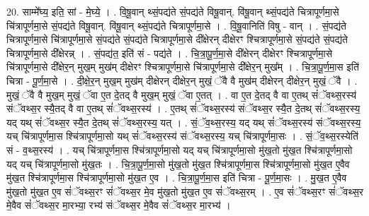 \documentclass[17pt]{extarticle}
\begin{document}
20. साम्मे᳚घ्य॒ इति॒ सां - मे॒घ्ये॒ । . वि॒षू॒वान् थ्सं॒पद्य॑ते सं॒पद्य॑ते विषू॒वान्. वि॑षू॒वान् थ्सं॒पद्य॑ते चित्रापूर्णमा॒से चि॑त्रापूर्णमा॒से सं॒पद्य॑ते विषू॒वान्. वि॑षू॒वान् थ्सं॒पद्य॑ते चित्रापूर्णमा॒से । . वि॒षू॒वानिति॑ विषु - वान् । . सं॒पद्य॑ते चित्रापूर्णमा॒से चि॑त्रापूर्णमा॒से सं॒पद्य॑ते सं॒पद्य॑ते चित्रापूर्णमा॒से दी᳚क्षेरन् दीक्षेरꣳ श्चित्रापूर्णमा॒से सं॒पद्य॑ते सं॒पद्य॑ते चित्रापूर्णमा॒से दी᳚क्षेरन्न् । . सं॒पद्य॑त॒ इति॑ सं - पद्य॑ते । . चि॒त्रा॒पू॒र्ण॒मा॒से दी᳚क्षेरन् दीक्षेरꣳ श्चित्रापूर्णमा॒से चि॑त्रापूर्णमा॒से दी᳚क्षेर॒न् मुख॒म् मुख॑म् दीक्षेरꣳ श्चित्रापूर्णमा॒से चि॑त्रापूर्णमा॒से दी᳚क्षेर॒न् मुख᳚म् । . चि॒त्रा॒पू॒र्ण॒मा॒स इति॑ चित्रा - पू॒र्ण॒मा॒से । . दी॒क्षे॒र॒न् मुख॒म् मुख॑म् दीक्षेरन् दीक्षेर॒न् मुखं॒ ॅवै वै मुख॑म् दीक्षेरन् दीक्षेर॒न् मुखं॒ ॅवै । . मुखं॒ ॅवै वै मुख॒म् मुखं॒ ॅवा ए॒त दे॒तद् वै मुख॒म् मुखं॒ ॅवा ए॒तत् । . वा ए॒त दे॒तद् वै वा ए॒तथ् सं॑ॅवथ्स॒रस्य॑ संॅवथ्स॒र स्यै॒तद् वै वा ए॒तथ् सं॑ॅवथ्स॒रस्य॑ । . ए॒तथ् सं॑ॅवथ्स॒रस्य॑ संॅवथ्स॒र स्यै॒त दे॒तथ् सं॑ॅवथ्स॒रस्य॒ यद् यथ् सं॑ॅवथ्स॒र स्यै॒त दे॒तथ् सं॑ॅवथ्स॒रस्य॒ यत् । . सं॒ॅव॒थ्स॒रस्य॒ यद् यथ् सं॑ॅवथ्स॒रस्य॑ संॅवथ्स॒रस्य॒ यच् चि॑त्रापूर्णमा॒स श्चि॑त्रापूर्णमा॒सो यथ् सं॑ॅवथ्स॒रस्य॑ संॅवथ्स॒रस्य॒ यच् चि॑त्रापूर्णमा॒सः । . सं॒ॅव॒थ्स॒रस्येति॑ सं - व॒थ्स॒रस्य॑ । . यच् चि॑त्रापूर्णमा॒स श्चि॑त्रापूर्णमा॒सो यद् यच् चि॑त्रापूर्णमा॒सो मु॑ख॒तो मु॑ख॒त श्चि॑त्रापूर्णमा॒सो यद् यच् चि॑त्रापूर्णमा॒सो मु॑ख॒तः । . चि॒त्रा॒पू॒र्ण॒मा॒सो मु॑ख॒तो मु॑ख॒त श्चि॑त्रापूर्णमा॒स श्चि॑त्रापूर्णमा॒सो मु॑ख॒त ए॒वैव मु॑ख॒त श्चि॑त्रापूर्णमा॒स श्चि॑त्रापूर्णमा॒सो मु॑ख॒त ए॒व । . चि॒त्रा॒पू॒र्ण॒मा॒स इति॑ चित्रा - पू॒र्ण॒मा॒सः । . मु॒ख॒त ए॒वैव मु॑ख॒तो मु॑ख॒त ए॒व सं॑ॅवथ्स॒रꣳ सं॑ॅवथ्स॒र मे॒व मु॑ख॒तो मु॑ख॒त ए॒व सं॑ॅवथ्स॒रम् । . ए॒व सं॑ॅवथ्स॒रꣳ सं॑ॅवथ्स॒र मे॒वैव सं॑ॅवथ्स॒र मा॒रभ्या॒ रभ्य॑ संॅवथ्स॒र मे॒वैव सं॑ॅवथ्स॒र मा॒रभ्य॑ । \newline
\end{document}
